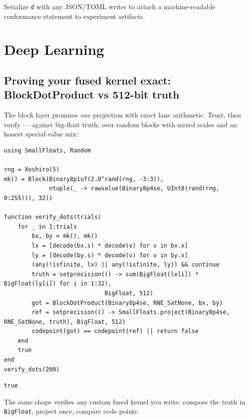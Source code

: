 Serialize \texttt{d} with any JSON/TOML writer to attach a machine-readable conformance statement to experiment artifacts.



\section{Deep Learning}



\label{15209394077164581735}{}


\subsection{Proving your fused kernel exact: BlockDotProduct vs 512-bit truth}



\label{13954472669056568806}{}


The block layer promises \emph{one} projection with exact lane arithmetic. Trust, then verify — against big-float truth, over random blocks with mixed scales and an honest special-value mix:




\begin{verbatim}
using SmallFloats, Random

rng = Xoshiro(5)
mk() = Block(Binary8p1uf(2.0^rand(rng, -3:3)),
             ntuple(_ -> rawvalue(Binary8p4se, UInt8(rand(rng, 0:255))), 32))

function verify_dots(trials)
    for _ in 1:trials
        bx, by = mk(), mk()
        lx = [decode(bx.s) * decode(v) for v in bx.x]
        ly = [decode(by.s) * decode(v) for v in by.x]
        (any(!isfinite, lx) || any(!isfinite, ly)) && continue
        truth = setprecision(() -> sum(BigFloat(lx[i]) * BigFloat(ly[i]) for i in 1:32),
                             BigFloat, 512)
        got = BlockDotProduct(Binary8p4se, RNE_SatNone, bx, by)
        ref = setprecision(() -> SmallFloats.project(Binary8p4se, RNE_SatNone, truth), BigFloat, 512)
        codepoint(got) == codepoint(ref) || return false
    end
    true
end
verify_dots(200)
\end{verbatim}




\begin{verbatim}
true
\end{verbatim}



The same shape verifies any custom fused kernel you write: compose the truth in \texttt{BigFloat}, project once, compare code points.



